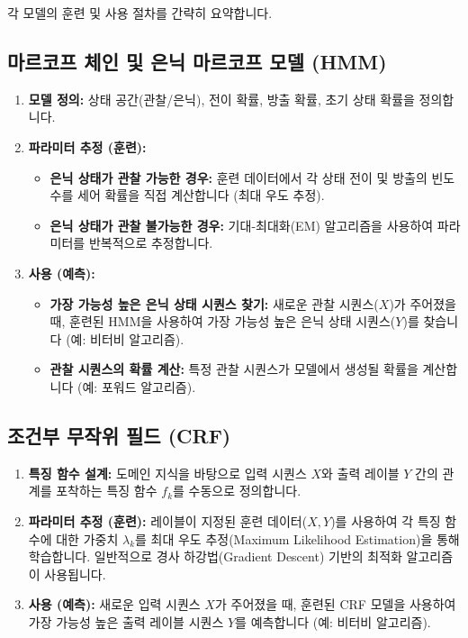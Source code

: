 \documentclass[11pt,a4paper]{article}
\begin{document}
각 모델의 훈련 및 사용 절차를 간략히 요약합니다.

\subsection{마르코프 체인 및 은닉 마르코프 모델 (HMM)}
\begin{enumerate}
    \item \textbf{모델 정의:} 상태 공간(관찰/은닉), 전이 확률, 방출 확률, 초기 상태 확률을 정의합니다.
    \item \textbf{파라미터 추정 (훈련):}
    \begin{itemize}
        \item \textbf{은닉 상태가 관찰 가능한 경우:} 훈련 데이터에서 각 상태 전이 및 방출의 빈도수를 세어 확률을 직접 계산합니다 (최대 우도 추정).
        \item \textbf{은닉 상태가 관찰 불가능한 경우:} 기대-최대화(EM) 알고리즘을 사용하여 파라미터를 반복적으로 추정합니다.
    \end{itemize}
    \item \textbf{사용 (예측):}
    \begin{itemize}
        \item \textbf{가장 가능성 높은 은닉 상태 시퀀스 찾기:} 새로운 관찰 시퀀스($X$)가 주어졌을 때, 훈련된 HMM을 사용하여 가장 가능성 높은 은닉 상태 시퀀스($Y$)를 찾습니다 (예: 비터비 알고리즘).
        \item \textbf{관찰 시퀀스의 확률 계산:} 특정 관찰 시퀀스가 모델에서 생성될 확률을 계산합니다 (예: 포워드 알고리즘).
    \end{itemize}
\end{enumerate}

\subsection{조건부 무작위 필드 (CRF)}
\begin{enumerate}
    \item \textbf{특징 함수 설계:} 도메인 지식을 바탕으로 입력 시퀀스 $X$와 출력 레이블 $Y$ 간의 관계를 포착하는 특징 함수 $f_k$를 수동으로 정의합니다.
    \item \textbf{파라미터 추정 (훈련):} 레이블이 지정된 훈련 데이터($X, Y$)를 사용하여 각 특징 함수에 대한 가중치 $\lambda_k$를 최대 우도 추정(Maximum Likelihood Estimation)을 통해 학습합니다. 일반적으로 경사 하강법(Gradient Descent) 기반의 최적화 알고리즘이 사용됩니다.
    \item \textbf{사용 (예측):} 새로운 입력 시퀀스 $X$가 주어졌을 때, 훈련된 CRF 모델을 사용하여 가장 가능성 높은 출력 레이블 시퀀스 $Y$를 예측합니다 (예: 비터비 알고리즘).
\end{enumerate}
\end{document}
